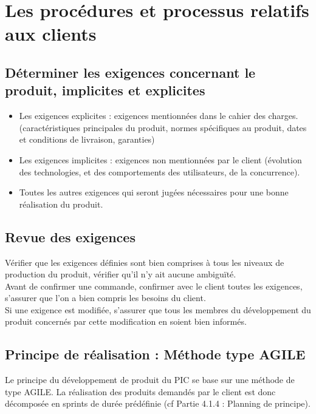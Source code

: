 
\section{Les procédures et processus relatifs aux clients}
\label{client}

\subsection{Déterminer les exigences concernant le produit, implicites et explicites}

\begin{itemize}
\item Les exigences explicites : exigences mentionnées dans le cahier des charges. (caractéristiques principales du produit, normes spécifiques au produit, dates et conditions de livraison, garanties)
\item Les exigences implicites : exigences non mentionnées par le client (évolution des technologies, et des comportements des utilisateurs, de la concurrence).
\item Toutes les autres exigences qui seront jugées nécessaires pour une bonne réalisation du produit.
\end{itemize}

\subsection{Revue des exigences}

Vérifier que les exigences définies sont bien comprises à tous les niveaux de production du produit, vérifier qu’il n’y ait aucune ambiguïté. \\
Avant de confirmer une commande, confirmer avec le client toutes les exigences, s’assurer que l’on a bien compris les besoins du client.\\
Si une exigence est modifiée, s’assurer que tous les membres du développement du produit concernés par cette modification en soient bien informés.\\

\subsection{Principe de réalisation : Méthode type AGILE}
Le principe du développement de produit du PIC \nomPIC{} se base sur une méthode de type
AGILE. La réalisation des produits demandés par le client est donc décomposée en sprints de durée prédéfinie (cf Partie 4.1.4 : Planning de principe).


